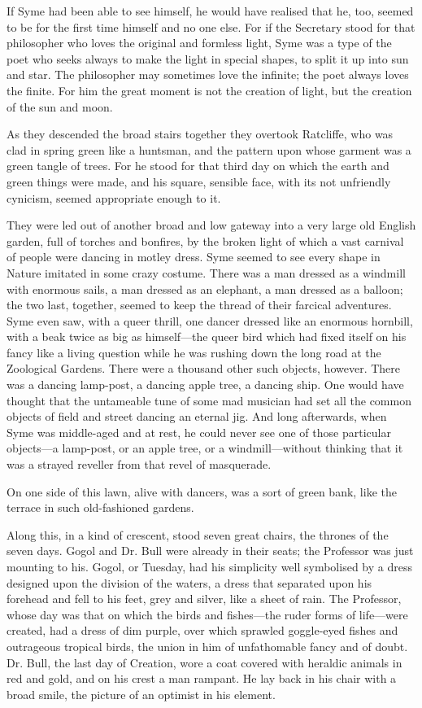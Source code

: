 \documentclass{book}
\begin{document}
If Syme had been able to see himself, he would have realised that he, too, seemed to be for the first time himself and no one else. For if the Secretary stood for that philosopher who loves the original and formless light, Syme was a type of the poet who seeks always to make the light in special shapes, to split it up into sun and star. The philosopher may sometimes love the infinite; the poet always loves the finite. For him the great moment is not the creation of light, but the creation of the sun and moon.

As they descended the broad stairs together they overtook Ratcliffe, who was clad in spring green like a huntsman, and the pattern upon whose garment was a green tangle of trees. For he stood for that third day on which the earth and green things were made, and his square, sensible face, with its not unfriendly cynicism, seemed appropriate enough to it.

They were led out of another broad and low gateway into a very large old English garden, full of torches and bonfires, by the broken light of which a vast carnival of people were dancing in motley dress. Syme seemed to see every shape in Nature imitated in some crazy costume. There was a man dressed as a windmill with enormous sails, a man dressed as an elephant, a man dressed as a balloon; the two last, together, seemed to keep the thread of their farcical adventures. Syme even saw, with a queer thrill, one dancer dressed like an enormous hornbill, with a beak twice as big as himself—the queer bird which had fixed itself on his fancy like a living question while he was rushing down the long road at the Zoological Gardens. There were a thousand other such objects, however. There was a dancing lamp-post, a dancing apple tree, a dancing ship. One would have thought that the untameable tune of some mad musician had set all the common objects of field and street dancing an eternal jig. And long afterwards, when Syme was middle-aged and at rest, he could never see one of those particular objects—a lamp-post, or an apple tree, or a windmill—without thinking that it was a strayed reveller from that revel of masquerade.

On one side of this lawn, alive with dancers, was a sort of green bank, like the terrace in such old-fashioned gardens.

Along this, in a kind of crescent, stood seven great chairs, the thrones of the seven days. Gogol and Dr. Bull were already in their seats; the Professor was just mounting to his. Gogol, or Tuesday, had his simplicity well symbolised by a dress designed upon the division of the waters, a dress that separated upon his forehead and fell to his feet, grey and silver, like a sheet of rain. The Professor, whose day was that on which the birds and fishes—the ruder forms of life—were created, had a dress of dim purple, over which sprawled goggle-eyed fishes and outrageous tropical birds, the union in him of unfathomable fancy and of doubt. Dr. Bull, the last day of Creation, wore a coat covered with heraldic animals in red and gold, and on his crest a man rampant. He lay back in his chair with a broad smile, the picture of an optimist in his element.
\end{document}
